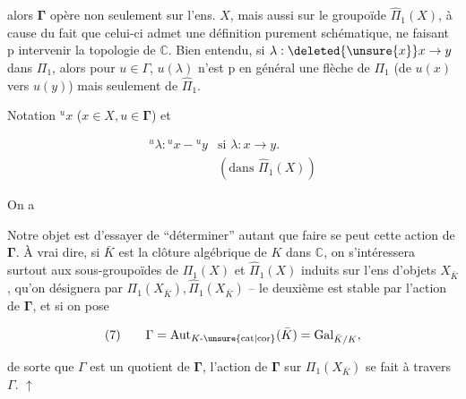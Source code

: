 alors $\mathbf{\Gamma}$ opère non seulement sur  l'ens. $X$, mais aussi sur le groupoïde $\widehat\Pi_1(X)$, à cause du fait que celui-ci admet une définition purement schématique, ne faisant p intervenir la topologie de $\mathbb C$. Bien entendu, si $\lambda:\deleted{\unsure{x}}x\to y$ dans $\Pi_1$, alors pour $u\in\Gamma$, $u(\lambda)$ n'est p en général une flèche de $\Pi_1$ (de $u(x)$ vers $u(y)$) mais seulement de $\widehat\Pi_1$.

 Notation ${}^ux$ ($x\in X,u\in\mathbf{\Gamma}$) et 

\[
\begin{array}{ll}
{}^u\lambda:{}^ux-{}^uy&\text{si }\lambda:x\to y.\\[-.4ex]
&(\text{dans }\widehat\Pi_1(X))
\end{array}
\]

On a


Notre objet est d'essayer de ``déterminer'' autant que faire se peut cette action de $\mathbf{\Gamma}$. À vrai dire, si $\bar K$ est la clôture algébrique de $K$ dans $\mathbb C$, on s'intéressera surtout aux sous-groupoïdes de $\Pi_1(X)$ et $\widehat\Pi_1(X)$ induits sur l'ens d'objets $X_{\bar K}$, qu'on désignera par $\Pi_1(X_{\bar K}),\widehat\Pi_1(X_{\bar K})$ -- le deuxième est stable par l'action de $\mathbf{\Gamma}$, et si on pose

\[
(7)\qquad\Gamma=\operatorname{Aut}_{K\text{-}\unsure{\mathrm{cat}|\mathrm{cor}}}(\bar K)=\operatorname{Gal}_{\bar K/K},
\]

de sorte que $\Gamma$ est un quotient de $\mathbf{\Gamma}$, l'action de $\mathbf{\Gamma}$ sur $\Pi_1(X_{\bar K})$ se fait à travers $\Gamma$. $\uparrow$

